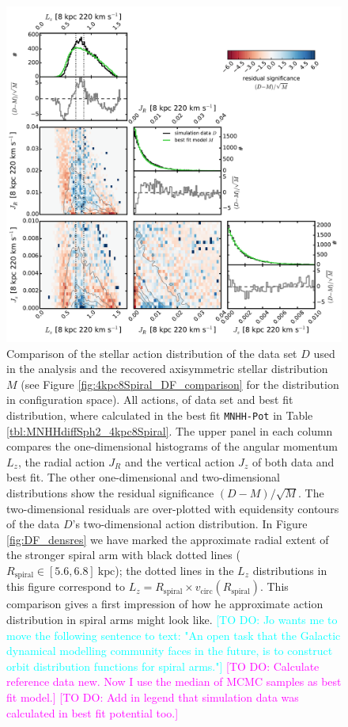 \documentclass[iop,revtex4,numberedappendix,appendixfloats]{emulateapj}
\newcommand{\Wilma}[1]{\textcolor{Magenta}{#1}}
\newcommand{\Jo}[1]{\textcolor{Cyan}{#1}}
\begin{document}
\begin{figure}[!htbp]
\centering
\includegraphics[width=\columnwidth]{fig/MNdHHdiffSph2_4kpc8Spiral_a_data_bestfit_residuals_only_actions.pdf}
\caption{Comparison of the stellar action distribution of the data set $D$ used in the analysis and the recovered axisymmetric stellar distribution $M$ (see Figure \ref{fig:4kpc8Spiral_DF_comparison} for the distribution in configuration space). All actions, of data set and best fit distribution, where calculated in the best fit \texttt{MNHH-Pot} in Table \ref{tbl:MNHHdiffSph2_4kpc8Spiral}. The upper panel in each column compares the one-dimensional histograms of the  angular momentum $L_z$, the radial action $J_R$ and the vertical action $J_z$ of both data and best fit. The other one-dimensional and two-dimensional distributions show the residual significance $(D-M)/\sqrt{M}$. The two-dimensional residuals are over-plotted with equidensity contours of the data $D$'s two-dimensional action distribution. In Figure \ref{fig:DF_densres} we have marked the approximate radial extent of the stronger spiral arm with black dotted lines ($R_\text{spiral} \in [5.6,6.8]~\text{kpc}$); the dotted lines in the $L_z$ distributions in this figure correspond to $L_z = R_\text{spiral} \times v_\text{circ}(R_\text{spiral})$. This comparison gives a first impression of how he approximate action distribution in spiral arms might look like. \Jo{[TO DO: Jo wants me to move the following sentence to text: "An open task that the Galactic dynamical modelling community faces in the future, is to construct orbit distribution functions for spiral arms."]} \Wilma{[TO DO: Calculate reference data new. Now I use the median of MCMC samples as best fit model.]} \Wilma{[TO DO: Add in legend that simulation data was calculated in best fit potential too.]}}
\label{fig:4kpc8Spiral_actions}
\end{figure}
\end{document}
